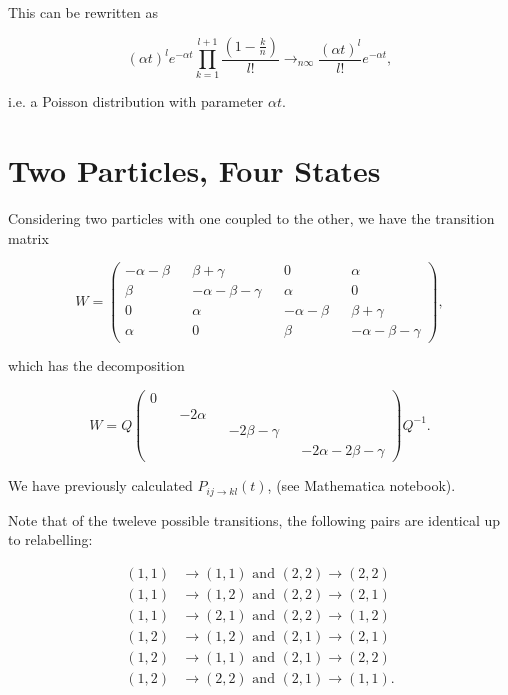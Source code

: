 \documentclass{article}
\begin{document}
This can be rewritten as

\begin{equation}
  (\alpha t)^l e^{-\alpha t}\prod_{k=1}^{l+1} \frac{(1-\frac{k}{n})}{l!}  \rightarrow_{n\infty} \frac{(\alpha t)^l}{l!} e^{-\alpha t},
\end{equation}

i.e. a Poisson distribution with parameter $\alpha t$.

\section{Two Particles, Four States}

Considering two particles with one coupled to the other, we have the transition matrix

\begin{equation}
  W = \begin{pmatrix} -\alpha - \beta && \beta + \gamma && 0 && \alpha \\
\beta && -\alpha-\beta-\gamma && \alpha && 0 \\
0 && \alpha && -\alpha-\beta && \beta +\gamma \\
\alpha && 0 && \beta && -\alpha -\beta - \gamma   \end{pmatrix},
\end{equation}

which has the decomposition

\begin{equation}
  W = Q \begin{pmatrix} 0 &&  &&  &&  \\
 && -2\alpha &&  &&  \\
 &&  && -2\beta -\gamma &&  \\
 &&  &&  && -2\alpha -2\beta - \gamma   \end{pmatrix} Q^{-1}.
\end{equation}

We have previously calculated $P_{ij \rightarrow kl}(t)$, (see Mathematica notebook). \newpage

Note that of the tweleve possible transitions, the following pairs are identical up to relabelling:

\begin{align}
  (1,1) &\rightarrow (1,1) \text{ and } (2,2) \rightarrow (2,2) \\
  (1,1) &\rightarrow (1,2) \text{ and } (2,2) \rightarrow (2,1)\\
  (1,1) &\rightarrow (2,1) \text{ and } (2,2) \rightarrow (1,2)\\
  (1,2) &\rightarrow (1,2) \text{ and } (2,1) \rightarrow (2,1)\\
  (1,2) &\rightarrow (1,1) \text{ and } (2,1) \rightarrow (2,2)\\
  (1,2) &\rightarrow (2,2) \text{ and } (2,1) \rightarrow (1,1).
\end{align}
\end{document}
